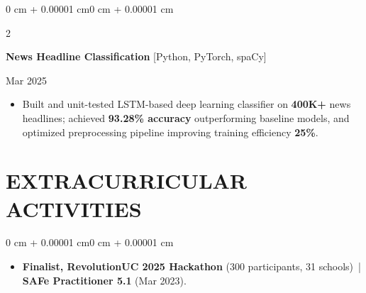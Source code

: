 \documentclass[10pt, letterpaper]{article}
\newenvironment{highlights}{
    \begin{itemize}[
        topsep=0.10 cm,
        parsep=0.06 cm,
        partopsep=0pt,
        itemsep=0.06 cm,
        leftmargin=12pt
    ]
}{
    \end{itemize}
}
\newenvironment{onecolentry}{
    \begin{adjustwidth}{0 cm + 0.00001 cm}{0 cm + 0.00001 cm}
}{
    \end{adjustwidth}
}
\newenvironment{twocolentry}[2][]{
    \onecolentry
    \def\secondColumn{#2}
    \setcolumnwidth{\fill, 4.5 cm}
    \begin{paracol}{2}
}{
    \switchcolumn \raggedleft \secondColumn
    \end{paracol}
    \endonecolentry
}
\begin{document}
\vspace{0.12 cm}

\begin{twocolentry}{Mar 2025}
\textbf{News Headline Classification} [Python, PyTorch, spaCy]
\end{twocolentry}
\begin{highlights}
  \item Built and unit-tested LSTM-based deep learning classifier on \textbf{400K+} news headlines; achieved \textbf{93.28\% accuracy} outperforming baseline models, and optimized preprocessing pipeline improving training efficiency \textbf{25\%}.
\end{highlights}

\section{EXTRACURRICULAR ACTIVITIES}
\begin{onecolentry}
\begin{highlights}
  \item \textbf{Finalist, RevolutionUC 2025 Hackathon} (300 participants, 31 schools) \,|\, \textbf{SAFe Practitioner 5.1} (Mar 2023).
\end{highlights}
\end{onecolentry}
\end{document}
